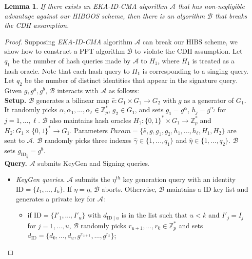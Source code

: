 \documentclass[times]{secauth}
\newtheorem{lemma}[theorem]{Lemma}
\theoremstyle{definition}
\theoremstyle{remark}
\begin{document}
\begin{lemma} \label{lemma-eps-hiboos}
If there exists an EKA-ID-CMA algorithm $\mathcal{A}$ that has non-negligible advantage against our HIBOOS scheme, 
then there is an algorithm $\mathcal{B}$ that breaks the CDH assumption.
\end{lemma}
\begin{proof}
Supposing \emph{EKA-ID-CMA} algorithm $\mathcal{A}$ can break our HIBS scheme, we show how to construct a PPT algorithm $\mathcal{B}$ to violate the CDH assumption. 
Let $q_1$ be the number of hash queries made by $\mathcal{A}$ to $H_1$, where $H_1$ is treated as a hash oracle.
Note that each hash query to $H_1$ is corresponding to a singing query. 
Let $q_2$ be the number of distinct identities that appear in the signature query.
Given $g, g^a, g^b$, $\mathcal{B}$ interacts with $\mathcal{A}$ as follows:
\vspace{0.2cm}
\\
\textbf{Setup.}
$\mathcal{B}$ generates a bilinear map $\hat{e}: G_1 \times G_1 \rightarrow G_2$ with $g$ as a generator of $G_1$.
It randomly picks $\alpha, \alpha_1, \ldots, \alpha_\ell \in \mathbb{Z}^*_p$, $g_2 \in G_1$, and sets $g_1 = g^\alpha$, $h_j = g^{\alpha_j}$ for $j = 1, \ldots, \ell$.
$\mathcal{B}$ also maintains hash oracles $H_1: \{0, 1\}^* \times G_1 \rightarrow \mathbb{Z}_p^*$ and $H_2: G_1 \times \{0, 1\}^* \rightarrow G_1$.
Parameters $Param = \{\hat{e}, g, g_1,  g_2, h_1, \ldots, h_\ell, H_1, H_2\}$ are sent to $\mathcal{A}$.
$\mathcal{B}$ randomly picks three indexes $\hat{\gamma} \in \{1, \ldots, q_1\}$ and $\hat{\eta} \in \{1, \ldots, q_2\}$. 
$\mathcal{B}$ sets $g_{\mathrm{ID}_{\hat{\eta}}} = g^b$.
\vspace{0.2cm}
\\
\textbf{Query.}
$\mathcal{A}$ submits KeyGen and Signing queries.
\begin{itemize}
	\item \emph{KeyGen queries}. 
	$\mathcal{A}$ submits the $\eta^{th}$ key generation query with an identity $\mathrm{ID} = \{I_1, \ldots, I_k\}$.
	If $\eta = \hat{\eta}$, $\mathcal{B}$ aborts. 
	Otherwise,  $\mathcal{B}$ maintains a ID-key list and generates a private key for $\mathcal{A}$: 
	\begin{itemize}
		\item if $\mathrm{ID} = \{I'_1, \ldots, I'_u\}$ with $d_{\mathrm{ID}\mid u}$ is in the list such that $u < k$ and $I'_j = I_j$ for $j = 1, \ldots, u$, $\mathcal{B}$ randomly picks $r_{u+1}, \ldots, r_k \in \mathbb{Z}_p^*$ and sets $d_{\mathrm{ID}} = \{d_0, \ldots, d_u, g^{r_{u+1}}, \ldots, g^{r_k}\}$;

\end{itemize}
\end{itemize}
\end{proof}
\end{document}
